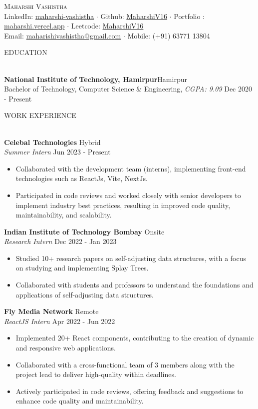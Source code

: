 \documentclass[a4paper]{article}
\newcommand{\bulletSep} { \vspace{2mm} }
\newcommand{\sectionSep} { \vspace{4mm} }
\newcommand{\lineunder} {
    \vspace*{-8pt} \\
    \hspace*{-15pt} \hrulefill \\
}
\newcommand{\header} [1] {
    {\hspace*{-18pt}\vspace*{6pt} {
        \large \scshape #1
    }}
    \vspace*{-6pt} \lineunder
    \vspace{1mm}
}
\newcommand{\educationItem}[5]{
    \textbf{#1}\hfill #2\\
    #3, \textit{#4} \hfill #5\\
}
\newcommand{\experienceItem}[5]{
    \textbf{#1} \hfill #2 \\
    \textit{#3} \hfill #4 \\
    \begin{itemize}
        #5
    \end{itemize}
}
\begin{document}

\begin{center}
    {\Huge \scshape {}\selectfont Maharshi Vashistha}\\
    \bulletSep
    LinkedIn: \href{https://www.linkedin.com/in/maharshi-vashistha/}{maharshi-vashistha} $\cdot$
    Github: \href{https://github.com/MaharshiV16}{MaharshiV16} $\cdot$
    Portfolio : \href{https://maharshi.vercel.app/}{maharshi.vercel.app} $\cdot$
    Leetcode: \href{https://leetcode.com/MaharshiV16/}{MaharshiV16} \\
    \bulletSep
    Email: \href {mailto:maharishivashistha@gmail.com}{maharishivashistha@gmail.com} $\cdot$ Mobile: (+91) 63771 13804\\
    \sectionSep
\end{center}

\vspace{-3mm}


\header{EDUCATION}

\educationItem{National Institute of Technology, Hamirpur}{Hamirpur}{Bachelor of Technology, Computer Science \& Engineering}{CGPA: 9.09}{Dec 2020 - Present}

\sectionSep


\header{WORK EXPERIENCE}

\experienceItem{Celebal Technologies}{Hybrid}{Summer Intern}{Jun 2023 - Present}{
     \item Collaborated with the development team (interns), implementing front-end technologies such as ReactJs, Vite, NextJs.
     \item Participated in code reviews and worked closely with senior developers to implement industry best practices, resulting in improved code quality, maintainability, and scalability.
}
\bulletSep

\experienceItem{Indian Institute of Technology Bombay}{Onsite}{Research Intern}{Dec 2022 - Jan 2023}{
     \item Studied 10+ research papers on self-adjusting data structures, with a focus on studying and implementing Splay Trees.
     \item Collaborated with students and professors to understand the foundations and applications of self-adjusting data structures.
}
\bulletSep

\experienceItem{Fly Media Network}{Remote}{ReactJS Intern}{Apr 2022 - Jun 2022}{
     \item Implemented 20+ React components, contributing to the creation of dynamic and responsive web applications.
     \item Collaborated with a cross-functional team of 3 members along with the project lead to deliver high-quality within deadlines.
    \item Actively participated in code reviews, offering feedback and suggestions to enhance code quality and maintainability.
}
\bulletSep
\end{document}
